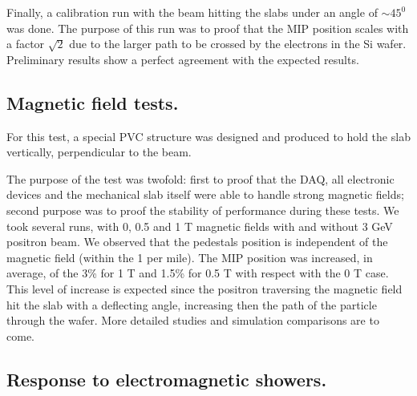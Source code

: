 \documentclass[journal]{IEEEtran}
\begin{document}
Finally, a calibration run with the beam hitting the slabs under an angle of $\sim 45^{0}$ was done.
The purpose of this run was to proof that the MIP position scales with a factor $\sqrt{2}$
due to the larger path to be crossed by the electrons in the Si wafer.
Preliminary results show a perfect agreement with the expected results.


\subsection{Magnetic field tests.}

For this test, a special PVC structure was
designed and produced to hold the slab vertically, perpendicular to the beam.

The purpose of the test was twofold: first to proof that the DAQ, all electronic devices and the mechanical slab itself were able
to handle strong magnetic fields; second purpose was to proof the stability of performance during these tests.
We took several runs, with 0, 0.5 and 1 T magnetic fields with and without 3 GeV positron beam.
We observed that the pedestals position is independent of the magnetic field (within the 1 per mile). The MIP position was increased, in average,
of the 3\% for 1 T and 1.5\% for 0.5 T with respect with the 0 T case.
This level of increase is expected since the positron traversing the magnetic field hit the slab with a deflecting angle,
increasing then the path of the particle through the wafer. More detailed studies and simulation comparisons are to come.


\subsection{Response to electromagnetic showers.}
\end{document}
